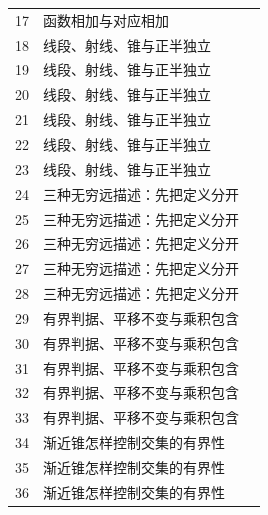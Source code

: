 \begin{longtable}{r p{.66\linewidth} r}
17 & 函数相加与对应相加 & \pageref{g:109:15}\\

18 & 线段、射线、锥与正半独立 & \pageref{g:109:18}\\

19 & 线段、射线、锥与正半独立 & \pageref{g:109:18}\\

20 & 线段、射线、锥与正半独立 & \pageref{g:109:18}\\

21 & 线段、射线、锥与正半独立 & \pageref{g:109:18}\\

22 & 线段、射线、锥与正半独立 & \pageref{g:109:18}\\

23 & 线段、射线、锥与正半独立 & \pageref{g:109:18}\\

24 & 三种无穷远描述：先把定义分开 & \pageref{g:109:24}\\

25 & 三种无穷远描述：先把定义分开 & \pageref{g:109:24}\\

26 & 三种无穷远描述：先把定义分开 & \pageref{g:109:24}\\

27 & 三种无穷远描述：先把定义分开 & \pageref{g:109:24}\\

28 & 三种无穷远描述：先把定义分开 & \pageref{g:109:24}\\

29 & 有界判据、平移不变与乘积包含 & \pageref{g:109:29}\\

30 & 有界判据、平移不变与乘积包含 & \pageref{g:109:29}\\

31 & 有界判据、平移不变与乘积包含 & \pageref{g:109:29}\\

32 & 有界判据、平移不变与乘积包含 & \pageref{g:109:29}\\

33 & 有界判据、平移不变与乘积包含 & \pageref{g:109:29}\\

34 & 渐近锥怎样控制交集的有界性 & \pageref{g:109:34}\\

35 & 渐近锥怎样控制交集的有界性 & \pageref{g:109:34}\\

36 & 渐近锥怎样控制交集的有界性 & \pageref{g:109:34}\\


\end{longtable}
